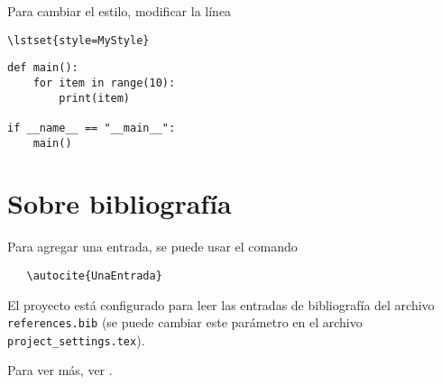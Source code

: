 Para cambiar el estilo, modificar la línea 
\begin{verbatim}
\lstset{style=MyStyle}
\end{verbatim}

\begin{lstlisting}
def main():
    for item in range(10):
        print(item)

if __name__ == "__main__":
    main()
\end{lstlisting}

\section{Sobre bibliografía}

Para agregar una entrada, se puede usar el comando

\begin{verbatim}
   \autocite{UnaEntrada} 
\end{verbatim}

El proyecto está configurado para leer las entradas de bibliografía del archivo \texttt{references.bib} (se puede cambiar este parámetro en el archivo \texttt{project\_settings.tex}).

Para ver más, ver \autocite{WikibookBiber}.











\clearpage
\printbibliography



